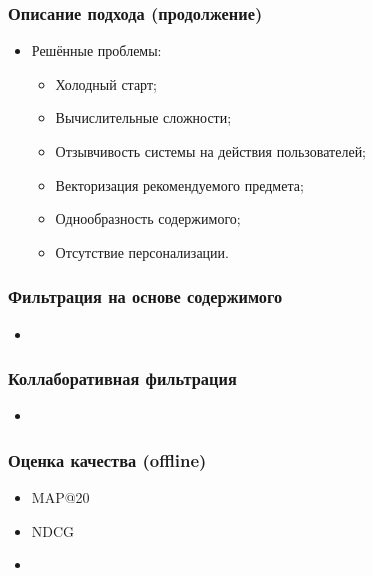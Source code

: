 \documentclass[xetex,mathserif,serif]{beamer}
\begin{document}
\begin{frame}
    \frametitle{Описание подхода (продолжение)}

	\begin{itemize}
        \item Решённые проблемы:
            \begin{itemize}
			    \item Холодный старт;
			    \item Вычислительные сложности;
                \item Отзывчивость системы на действия пользователей;
			    \item Векторизация рекомендуемого предмета;
			    \item Однообразность содержимого;
			    \item Отсутствие персонализации.
            \end{itemize}
	\end{itemize}
\end{frame}



\begin{frame}
    \frametitle{Фильтрация на основе содержимого}

	\begin{itemize}
		\item 
	\end{itemize}
\end{frame}

\begin{frame}
    \frametitle{Коллаборативная фильтрация}

	\begin{itemize}
		\item 
	\end{itemize}
\end{frame}

\begin{frame}
    \frametitle{Оценка качества (offline)}

	\begin{itemize}
		\item MAP@20
		\item NDCG
		\item 
	\end{itemize}
\end{frame}
\end{document}
